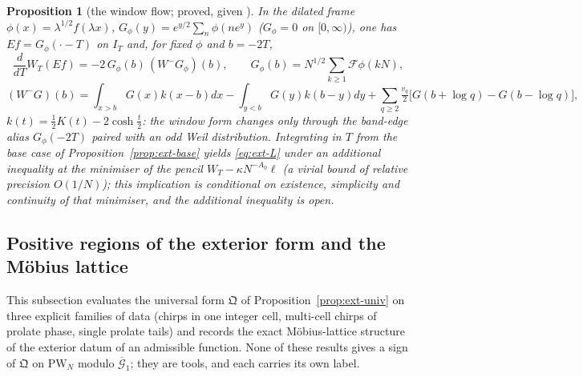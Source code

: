 \documentclass[11pt]{amsart}
\newtheorem{proposition}[theorem]{Proposition}
\theoremstyle{definition}
\theoremstyle{remark}
\newcommand{\IT}{I_T}
\begin{document}
\begin{proposition}[{the window flow; proved, given \cite[Lemma~4.4]{Guo2026}}]\label{prop:ext-flow}
In the dilated frame $\phi(x)=\lambda^{1/2}f(\lambda x)$, $G_\phi(y)=e^{y/2}\sum_n\phi(ne^y)$ ($G_\phi=0$ on $[0,\infty)$), one has
$Ef=G_\phi(\cdot-T)$ on $\IT$ and, for fixed $\phi$ and $b=-2T$,
\[
\frac d{dT}W_T(Ef)=-2\,G_\phi(b)\,(W^-G_\phi)(b),\qquad G_\phi(b)=N^{1/2}\sum_{k\ge1}\mathcal F\phi(kN),
\]
\[
(W^-G)(b)=\int_{x>b}G(x)k(x-b)dx-\int_{y<b}G(y)k(b-y)dy+\sum_{q\ge2}\tfrac{v_q}2\big[G(b+\log q)-G(b-\log q)\big],
\]
$k(t)=\frac12K(t)-2\cosh\frac t2$: the window form changes only through the band-edge alias $G_\phi(-2T)$ paired with an odd Weil
distribution. Integrating in $T$ from the base case of Proposition~\ref{prop:ext-base} yields \eqref{eq:ext-L} under an additional
inequality at the minimiser of the pencil $W_T-\kappa N^{-A_0}\ell$ (a virial bound of relative precision $O(1/N)$); this
implication is conditional on existence, simplicity and continuity of that minimiser, and the additional inequality is open.
\end{proposition}

\subsection{Positive regions of the exterior form and the M\"obius lattice}\label{subsec:ext-pos}

This subsection evaluates the universal form $\mathfrak Q$ of Proposition~\ref{prop:ext-univ} on three explicit families of
data (chirps in one integer cell, multi-cell chirps of prolate phase, single prolate tails) and records the exact
M\"obius-lattice structure of the exterior datum of an admissible function. None of these results gives a sign of
$\mathfrak Q$ on $\mathrm{PW}_N$ modulo $\overline{\mathcal G}_1$; they are tools, and each carries its own label.
\end{document}
